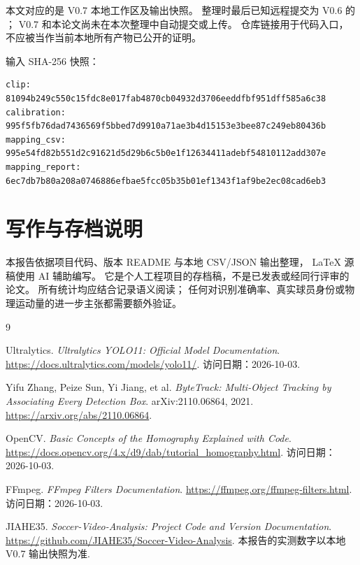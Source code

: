 \documentclass[UTF8,fontset=fandol,11pt,a4paper]{ctexart}
\newcommand{\code}[1]{\texttt{\detokenize{#1}}}
\begin{document}
本文对应的是 V0.7 本地工作区及输出快照。
整理时最后已知远程提交为 V0.6 的 \code{1b57822}；
V0.7 和本论文尚未在本次整理中自动提交或上传。
仓库链接用于代码入口，不应被当作当前本地所有产物已公开的证明。

\noindent 输入 SHA-256 快照：
\begin{lstlisting}
clip:
81094b249c550c15fdc8e017fab4870cb04932d3706eeddfbf951dff585a6c38
calibration:
995f5fb76dad7436569f5bbed7d9910a71ae3b4d15153e3bee87c249eb80436b
mapping_csv:
995e54fd82b551d2c91621d5d29b6c5b0e1f12634411adebf54810112add307e
mapping_report:
6ec7db7b80a208a0746886efbae5fcc05b35b01ef1343f1af9be2ec08cad6eb3
\end{lstlisting}

\section*{写作与存档说明}
本报告依据项目代码、版本 README 与本地 CSV/JSON 输出整理，
LaTeX 源稿使用 AI 辅助编写。
它是个人工程项目的存档稿，不是已发表或经同行评审的论文。
所有统计均应结合记录语义阅读；
任何对识别准确率、真实球员身份或物理运动量的进一步主张都需要额外验证。

\begin{thebibliography}{9}

Ultralytics.
\emph{Ultralytics YOLO11: Official Model Documentation}.
\url{https://docs.ultralytics.com/models/yolo11/}.
访问日期：2026-10-03.

Yifu Zhang, Peize Sun, Yi Jiang, et al.
\emph{ByteTrack: Multi-Object Tracking by Associating Every Detection Box}.
arXiv:2110.06864, 2021.
\url{https://arxiv.org/abs/2110.06864}.

OpenCV.
\emph{Basic Concepts of the Homography Explained with Code}.
\url{https://docs.opencv.org/4.x/d9/dab/tutorial_homography.html}.
访问日期：2026-10-03.

FFmpeg.
\emph{FFmpeg Filters Documentation}.
\url{https://ffmpeg.org/ffmpeg-filters.html}.
访问日期：2026-10-03.

JIAHE35.
\emph{Soccer-Video-Analysis: Project Code and Version Documentation}.
\url{https://github.com/JIAHE35/Soccer-Video-Analysis}.
本报告的实测数字以本地 V0.7 输出快照为准.

\end{thebibliography}
\end{document}
